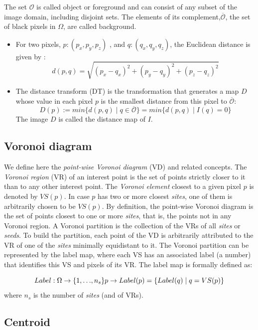 The set \({\mathcal{O}}\) is called object or foreground and can consist of any subset of the image domain, including disjoint sets.
The elements of its complement,\(\overline{\mathcal{O}}\), the set of black pixels in \({\Omega}\), are called background.
\begin{itemize}
\item For two pixels, \({p : (p_x, p_y, p_z)}\) , and \({q : (q_x, q_y, q_z)}\), the Euclidean distance is given by : 
\[
d(p,q) = \sqrt{ (p_x-q_x)^{2}+(p_y-q_y)^{2}+(p_z-q_z)^{2} }
\]
%
\item The distance transform (DT) is the transformation that generates a map \({D}\) whose value in each pixel \({p}\) is the smallest distance from this pixel to \(\overline{\mathcal{O}}\):
\[
D(p) := min\{ d(p,q) \mid q \in \overline{\mathcal{O}}\} = min\{ d(p,q) \mid I(q) = 0 \}
\]
The image \({D}\) is called the distance map of \({I}\).
\end{itemize}


\subsection{Voronoi diagram}

We define here the \emph{point-wise Voronoi diagram} (VD) and related concepts.
The \emph{Voronoi region} (VR) of an interest point is the set of points strictly closer to it than to any other interest point. The \emph{Voronoi element} closest to a given pixel \({p}\) is denoted by {\( VS(p) \)}. In case \({p}\) has two or more closest \emph{sites}, one of them is arbitrarily chosen to be {\( VS(p) \)}. By definition, the point-wise Voronoi diagram is the set of points closest to one or more \emph{sites}, that is, the points not in any Voronoi region. A Voronoi partition is the collection of the VRs of all \emph{sites} or \emph{seeds}. To build the partition, each point of the VD is arbitrarily attributed to the VR of one of the \emph{sites} minimally equidistant to it.
The Voronoi partition can be represented by the label map, where each VS has an associated label (a number) that identifies this VS and pixels of its VR. The label map is formally defined as:

\[
Label : \Omega \rightarrow \{ 1,{\dots},n_s \}  \\
p \rightarrow Label(p) = \{ Label(q) \mid q = VS(p) \}
\]
where \({n_s}\) is the number of \emph{sites} (and of VRs).



\subsection{Centroid}

